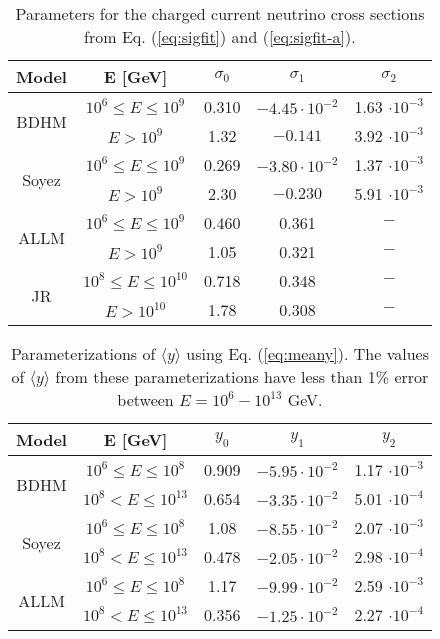 \documentclass[aps,10pt,twocolumn,tightenlines]{revtex4-1}
\begin{document}
\begin{table}[h]
\caption{Parameters for the charged current neutrino cross sections from Eq. (\ref{eq:sigfit}) and  (\ref{eq:sigfit-a}).}
\begin{center}
\begin{tabular}{|c|c|c|c|c|}
\hline
Model & E [GeV] & $\sigma_0$ & $\sigma_1$ & $\sigma_2$\\
\hline 
\multirow{2}{*}{BDHM}& $10^{6} \leq E \leq 10^{9}$ & 0.310 &  $-4.45\cdot 10^{-2} $ & 1.63 $\cdot 10^{-3}$\\
\cline{2-5}
& $ E  >10^{9}$ & 1.32 & $ -0.141$ & 3.92 $\cdot 10^{-3}$\\
\hline 
\multirow{2}{*}{Soyez}& $10^{6} \leq E \leq 10^{9}$  & 0.269 & $ -3.80 \cdot 10^{-2}$ & 1.37 $\cdot 10^{-3}$\\
\cline{2-5}
& $ E  >10^{9} $ & 2.30 & $ -0.230$ & 5.91 $\cdot 10^{-3}$\\
\hline 
\multirow{2}{*}{ALLM}& $10^{6} \leq E \leq 10^{9}$  & 0.460 &  0.361 & $-$ \\
\cline{2-5}
& $E  >10^{9}   $ & 1.05 & 0.321 & $-$\\
\hline 
\multirow{2}{*}{JR \cite{Jeong:2010za}}& $10^{8} \leq E \leq 10^{10}$  & 0.718 &  0.348 & $-$ \\
\cline{2-5}
& $E  >10^{10}   $ & 1.78 & 0.308 & $-$\\
\hline
\end{tabular}
\end{center}
\label{table:sigcc}
\end{table}%


\begin{table}[h]
\caption{Parameterizations of $\langle y \rangle$ using Eq. (\ref{eq:meany}). 
The values of $\langle y \rangle$ from these parameterizations 
have less than 1\% error between $E=10^6-10^{13}$ GeV. }
\begin{center}
\begin{tabular}{|c|c|c|c|c|}
\hline
Model & E [GeV] & $y_0$ & $y_1$ & $y_2$\\
\hline 
\multirow{2}{*}{BDHM}& $10^{6} \leq E \leq 10^{8}$ & 0.909 & $ -5.95 \cdot 10^{-2}$ & 1.17 $\cdot 10^{-3}$\\
\cline{2-5}
& $10^{8} < E \leq 10^{13}$ & 0.654 & $ -3.35\cdot 10^{-2}$ & 5.01 $\cdot 10^{-4}$\\
\hline 
\multirow{2}{*}{Soyez}& $10^{6} \leq E \leq 10^{8}$  & 1.08 & $ -8.55 \cdot 10^{-2}$ & 2.07 $\cdot 10^{-3}$\\
\cline{2-5}
& $10^{8} < E \leq 10^{13}$ & 0.478 & $ -2.05 \cdot 10^{-2}$ & 2.98 $\cdot 10^{-4}$\\
\hline 
\multirow{2}{*}{ALLM}& $10^{6} \leq E \leq 10^{8}$  & 1.17 & $ -9.99 \cdot 10^{-2}$ & 2.59 $\cdot 10^{-3}$\\
\cline{2-5}
& $10^{8} < E \leq 10^{13}$ & 0.356 & $ -1.25 \cdot 10^{-2}$ & 2.27 $\cdot 10^{-4}$\\
\hline 
\end{tabular}
\end{center}
\label{table:avgy}
\end{table}%
\end{document}
